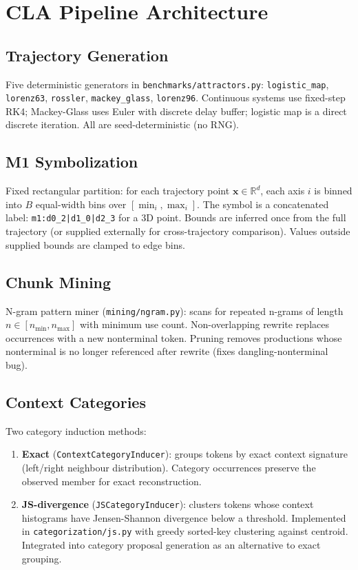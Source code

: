 \documentclass[11pt]{article}
\begin{document}
\section{CLA Pipeline Architecture}

\subsection{Trajectory Generation}

Five deterministic generators in \texttt{benchmarks/attractors.py}:
\texttt{logistic\_map}, \texttt{lorenz63}, \texttt{rossler},
\texttt{mackey\_glass}, \texttt{lorenz96}. Continuous systems use
fixed-step RK4; Mackey-Glass uses Euler with discrete delay buffer;
logistic map is a direct discrete iteration. All are seed-deterministic
(no RNG).

\subsection{M1 Symbolization}

Fixed rectangular partition: for each trajectory point $\mathbf{x} \in
\mathbb{R}^d$, each axis $i$ is binned into $B$ equal-width bins over
$[\min_i, \max_i]$. The symbol is a concatenated label:
\texttt{m1:d0\_2|d1\_0|d2\_3} for a 3D point. Bounds are inferred once
from the full trajectory (or supplied externally for cross-trajectory
comparison). Values outside supplied bounds are clamped to edge bins.

\subsection{Chunk Mining}

N-gram pattern miner (\texttt{mining/ngram.py}): scans for repeated
n-grams of length $n \in [n_{\min}, n_{\max}]$ with minimum use count.
Non-overlapping rewrite replaces occurrences with a new nonterminal
token. Pruning removes productions whose nonterminal is no longer
referenced after rewrite (fixes dangling-nonterminal bug).

\subsection{Context Categories}

Two category induction methods:
\begin{enumerate}
\item \textbf{Exact} (\texttt{ContextCategoryInducer}): groups tokens
by exact context signature (left/right neighbour distribution).
Category occurrences preserve the observed member for exact reconstruction.
\item \textbf{JS-divergence} (\texttt{JSCategoryInducer}): clusters tokens
whose context histograms have Jensen-Shannon divergence below a
threshold. Implemented in \texttt{categorization/js.py} with greedy
sorted-key clustering against centroid. Integrated into category proposal
generation as an alternative to exact grouping.
\end{enumerate}
\end{document}
